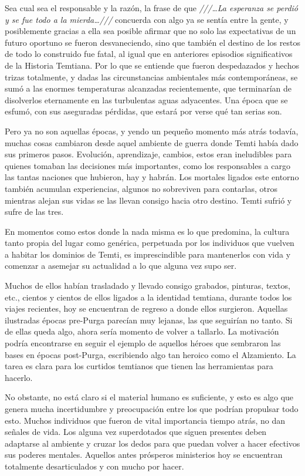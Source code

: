 \documentclass[
  spanish,
]{book}
\begin{document}
Sea cual sea el responsable y la razón, la frase de que \emph{///\ldots La esperanza se perdió y se fue todo a la mierda\ldots///} concuerda con algo ya se sentía entre la gente, y posiblemente gracias a ella sea posible afirmar que no solo las expectativas de un futuro oportuno se fueron desvaneciendo, sino que también el destino de los restos de todo lo construido fue fatal, al igual que en anteriores episodios significativos de la Historia Temtiana. Por lo que se entiende que fueron despedazados y hechos trizas totalmente, y dadas las circunstancias ambientales más contemporáneas, se sumó a las enormes temperaturas alcanzadas recientemente, que terminarían de disolverlos eternamente en las turbulentas aguas adyacentes. Una época que se esfumó, con sus aseguradas pérdidas, que estará por verse qué tan serias son.

Pero ya no son aquellas épocas, y yendo un pequeño momento más atrás todavía, muchas cosas cambiaron desde aquel ambiente de guerra donde Temti había dado sus primeros pasos. Evolución, aprendizaje, cambios, estos eran ineludibles para quienes tomaban las decisiones más importantes, como los responsables a cargo las tantas naciones que hubieron, hay y habrán. Los mortales ligados este entorno también acumulan experiencias, algunos no sobreviven para contarlas, otros mientras alejan sus vidas se las llevan consigo hacia otro destino. Temti sufrió y sufre de las tres.

En momentos como estos donde la nada misma es lo que predomina, la cultura tanto propia del lugar como genérica, perpetuada por los individuos que vuelven a habitar los dominios de Temti, es imprescindible para mantenerlos con vida y comenzar a asemejar su actualidad a lo que alguna vez supo ser.

Muchos de ellos habían trasladado y llevado consigo grabados, pinturas, textos, etc., cientos y cientos de ellos ligados a la identidad temtiana, durante todos los viajes recientes, hoy se encuentran de regreso a donde ellos surgieron. Aquellas ilustradas épocas pre-Purga parecían muy lejanas, las que seguirían no tanto. Si de ellas queda algo, ahora sería momento de volver a tallarlo. La motivación podría encontrarse en seguir el ejemplo de aquellos héroes que sembraron las bases en épocas post-Purga, escribiendo algo tan heroico como el Alzamiento. La tarea es clara para los curtidos temtianos que tienen las herramientas para hacerlo.

No obstante, no está claro si el material humano es suficiente, y esto es algo que genera mucha incertidumbre y preocupación entre los que podrían propulsar todo esto. Muchos individuos que fueron de vital importancia tiempo atrás, no dan señales de vida. Los alguna vez superdotados que siguen presentes deben adaptarse al ambiente y cruzar los dedos para que puedan volver a hacer efectivos sus poderes mentales. Aquellos antes prósperos ministerios hoy se encuentran totalmente desarticulados y con mucho por hacer.
\end{document}
